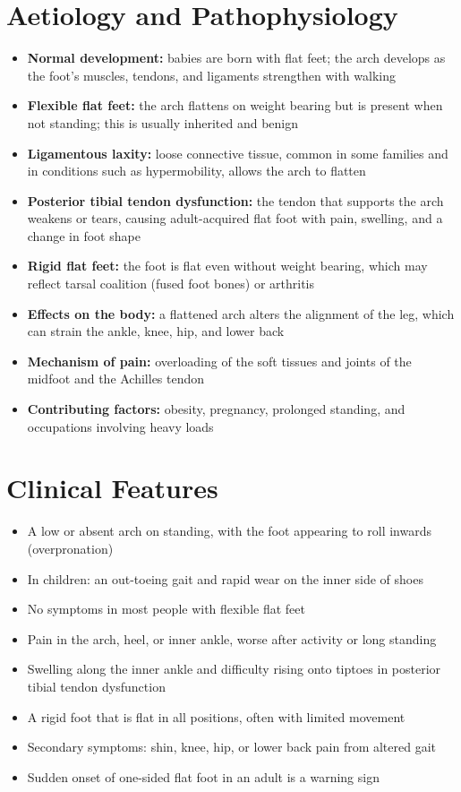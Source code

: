 \section*{Aetiology and Pathophysiology}
\begin{itemize}
    \item \textbf{Normal development:} babies are born with flat feet; the arch develops as the foot's muscles, tendons, and ligaments strengthen with walking
    \item \textbf{Flexible flat feet:} the arch flattens on weight bearing but is present when not standing; this is usually inherited and benign
    \item \textbf{Ligamentous laxity:} loose connective tissue, common in some families and in conditions such as hypermobility, allows the arch to flatten
    \item \textbf{Posterior tibial tendon dysfunction:} the tendon that supports the arch weakens or tears, causing adult-acquired flat foot with pain, swelling, and a change in foot shape
    \item \textbf{Rigid flat feet:} the foot is flat even without weight bearing, which may reflect tarsal coalition (fused foot bones) or arthritis
    \item \textbf{Effects on the body:} a flattened arch alters the alignment of the leg, which can strain the ankle, knee, hip, and lower back
    \item \textbf{Mechanism of pain:} overloading of the soft tissues and joints of the midfoot and the Achilles tendon
    \item \textbf{Contributing factors:} obesity, pregnancy, prolonged standing, and occupations involving heavy loads
\end{itemize}

\section*{Clinical Features}
\begin{itemize}
    \item A low or absent arch on standing, with the foot appearing to roll inwards (overpronation)
    \item In children: an out-toeing gait and rapid wear on the inner side of shoes
    \item No symptoms in most people with flexible flat feet
    \item Pain in the arch, heel, or inner ankle, worse after activity or long standing
    \item Swelling along the inner ankle and difficulty rising onto tiptoes in posterior tibial tendon dysfunction
    \item A rigid foot that is flat in all positions, often with limited movement
    \item Secondary symptoms: shin, knee, hip, or lower back pain from altered gait
    \item Sudden onset of one-sided flat foot in an adult is a warning sign
\end{itemize}

